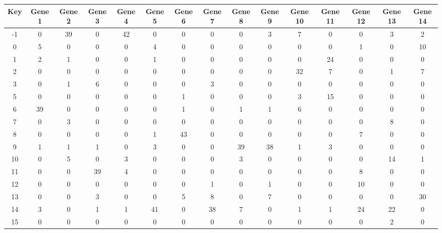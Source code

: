 \begin{tabular}{|c|c|c|c|c|c|c|c|c|c|c|c|c|c|c|}
\hline
Key & Gene 1 & Gene 2 & Gene 3 & Gene 4 & Gene 5 & Gene 6 & Gene 7 & Gene 8 & Gene 9 & Gene 10 & Gene 11 & Gene 12 & Gene 13 & Gene 14 \\
\hline
-1 & 0 & 39 & 0 & 42 & 0 & 0 & 0 & 0 & 3 & 7 & 0 & 0 & 3 & 2 \\
0 & 5 & 0 & 0 & 0 & 4 & 0 & 0 & 0 & 0 & 0 & 0 & 1 & 0 & 10 \\
1 & 2 & 1 & 0 & 0 & 1 & 0 & 0 & 0 & 0 & 0 & 24 & 0 & 0 & 0 \\
2 & 0 & 0 & 0 & 0 & 0 & 0 & 0 & 0 & 0 & 32 & 7 & 0 & 1 & 7 \\
3 & 0 & 1 & 6 & 0 & 0 & 0 & 3 & 0 & 0 & 0 & 0 & 0 & 0 & 0 \\
5 & 0 & 0 & 0 & 0 & 0 & 1 & 0 & 0 & 0 & 3 & 15 & 0 & 0 & 0 \\
6 & 39 & 0 & 0 & 0 & 0 & 1 & 0 & 1 & 1 & 6 & 0 & 0 & 0 & 0 \\
7 & 0 & 3 & 0 & 0 & 0 & 0 & 0 & 0 & 0 & 0 & 0 & 0 & 8 & 0 \\
8 & 0 & 0 & 0 & 0 & 1 & 43 & 0 & 0 & 0 & 0 & 0 & 7 & 0 & 0 \\
9 & 1 & 1 & 1 & 0 & 3 & 0 & 0 & 39 & 38 & 1 & 3 & 0 & 0 & 0 \\
10 & 0 & 5 & 0 & 3 & 0 & 0 & 0 & 3 & 0 & 0 & 0 & 0 & 14 & 1 \\
11 & 0 & 0 & 39 & 4 & 0 & 0 & 0 & 0 & 0 & 0 & 0 & 8 & 0 & 0 \\
12 & 0 & 0 & 0 & 0 & 0 & 0 & 1 & 0 & 1 & 0 & 0 & 10 & 0 & 0 \\
13 & 0 & 0 & 3 & 0 & 0 & 5 & 8 & 0 & 7 & 0 & 0 & 0 & 0 & 30 \\
14 & 3 & 0 & 1 & 1 & 41 & 0 & 38 & 7 & 0 & 1 & 1 & 24 & 22 & 0 \\
15 & 0 & 0 & 0 & 0 & 0 & 0 & 0 & 0 & 0 & 0 & 0 & 0 & 2 & 0 \\
\hline
\end{tabular}